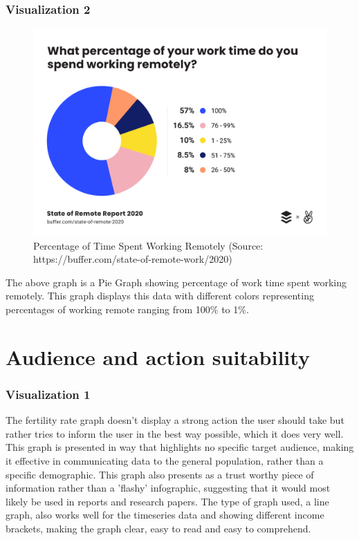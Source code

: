 \documentclass{article}
\begin{document}
\subsubsection{Visualization 2}
\begin{figure}[!htb]
\includegraphics[width=\textwidth]{chart3.png} 
\caption{Percentage of Time Spent Working Remotely (Source: https://buffer.com/state-of-remote-work/2020)}
\end{figure}

The above graph is a Pie Graph showing percentage of work time spent working remotely. This graph displays this data with different colors representing percentages of working remote ranging from 100\% to 1\%. 

\pagebreak 

\section{Audience and action suitability}
\subsubsection{Visualization 1}
The fertility rate graph doesn’t display a strong action the user should take but rather tries to inform the user in the best way possible, which it does very well. This graph is presented in way that highlights no specific target audience, making it effective in communicating data to the general population, rather than a specific demographic. This graph also presents as a trust worthy piece of information rather than a 'flashy' infographic, suggesting that it would most likely be used in reports and research papers. The type of graph used, a line graph, also works well for the timeseries data and showing different income brackets, making the graph clear, easy to read and easy to comprehend. 
\end{document}
